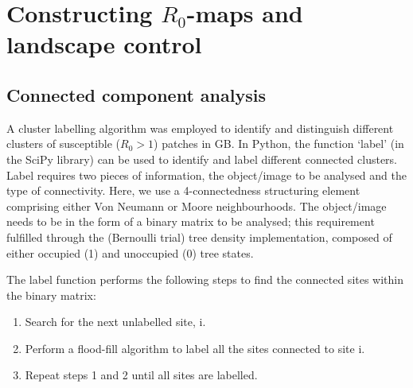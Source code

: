 \newpage

\chapter{Constructing $R_0$-maps and landscape control}

\label{section:ga-SEIR-variant}

\section{Connected component analysis}
\label{a:CCA}

A cluster labelling algorithm was employed to identify and distinguish different clusters of susceptible ($R_0 > 1$) patches in GB.
In Python, the function `label' (in the SciPy library) can be used to identify and label different connected clusters.
Label requires two pieces of information, the object/image to be analysed and the type of connectivity.
Here, we use a 4-connectedness structuring element comprising either Von Neumann or Moore neighbourhoods.
The object/image needs to be in the form of a binary matrix to be analysed;
this requirement fulfilled through the (Bernoulli trial) tree density implementation, composed of either occupied (1) and unoccupied (0) tree states.

The label function performs the following steps to find the connected sites within the binary matrix:
\begin{enumerate}
    \item Search for the next unlabelled site, i.
    \item Perform a flood-fill algorithm to label all the sites connected to site i.
    \item Repeat steps 1 and 2 until all sites are labelled.
\end{enumerate}

